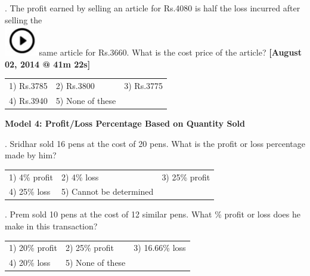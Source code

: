 \documentclass{article}
\begin{document}
	\noindent 
	
	\noindent 
	
	\noindent 
	
	. The profit earned by selling an article for Rs.4080 is half the loss incurred after selling the \noindent \\ \includegraphics*[width=0.60in, height=0.52in]{images/image1}same article for Rs.3660. What is the cost price of the article?     \textbf{[August 02, 2014 @ 41m 22s]}
	
	\noindent  
	\begin{tabular}{p{1.7in} p{1.6in} p{1.6in}} \\ 
 1) Rs.3785               & 2) Rs.3800        & 3) Rs.3775        \\
4) Rs.3940        & 5) None of these  \\
\end{tabular}
	
	\noindent 
	
	\noindent 
	
	\noindent 
	
	\noindent 
	
	\noindent \textbf{Model 4: Profit/Loss Percentage Based on Quantity Sold}
	
	\noindent 
	
	. Sridhar sold 16 pens at the cost of 20 pens. What is the profit or loss percentage made by him?
	
	\noindent  
	\begin{tabular}{p{1.7in} p{1.6in} p{1.6in}} \\ 
 1) 4\% profit            & 2) 4\% loss        & 3) 25\% profit   \\
4) 25\% loss      & 5) Cannot be determined \\
\end{tabular}
	
	\noindent 
	
	\noindent 
	
	\noindent 
	
	. Prem sold 10 pens at the cost of 12 similar pens. What \% profit or loss does he make in this transaction?
	
	\noindent  
	\begin{tabular}{p{1.7in} p{1.6in} p{1.6in}} \\ 
 1) 20\% profit                                                 & 2) 25\% profit                             & 3) 16.66\% loss
	
	\noindent 
	
	\noindent \\
4) 20\% loss                                                    & 5) None of these  \\
\end{tabular}
	
\end{document}
